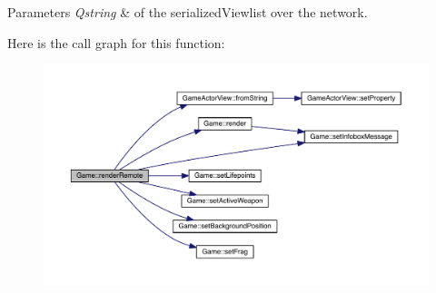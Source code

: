 \begin{DoxyParams}{Parameters}
{\em Qstring} & of the serialized\+Viewlist over the network. \\
\hline
\end{DoxyParams}


Here is the call graph for this function\+:\nopagebreak
\begin{figure}[H]
\begin{center}
\leavevmode
\includegraphics[width=350pt]{class_game_aab513bbe5db45b1f9dba205d0ddec74e_cgraph}
\end{center}
\end{figure}


